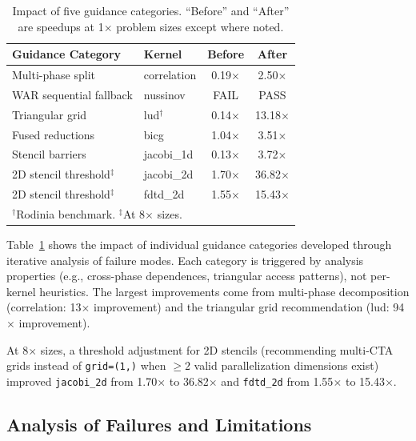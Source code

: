 \documentclass[sigconf]{acmart}
\begin{document}
\begin{table}[t]
  \caption{Impact of five guidance categories.  ``Before'' and
    ``After'' are speedups at 1$\times$ problem sizes except where noted.}
  \label{tab:guidance_fixes}
  \centering\small
  \begin{tabular}{llcc}
    \toprule
    \textbf{Guidance Category} & \textbf{Kernel} & \textbf{Before} & \textbf{After} \\
    \midrule
    Multi-phase split      & correlation & 0.19$\times$ & 2.50$\times$ \\
    WAR sequential fallback & nussinov   & FAIL          & PASS         \\
    Triangular grid        & lud$^\dagger$ & 0.14$\times$ & 13.18$\times$ \\
    Fused reductions       & bicg        & 1.04$\times$ & 3.51$\times$ \\
    Stencil barriers       & jacobi\_1d  & 0.13$\times$ & 3.72$\times$ \\
    \midrule
    2D stencil threshold$^\ddagger$ & jacobi\_2d & 1.70$\times$ & 36.82$\times$ \\
    2D stencil threshold$^\ddagger$ & fdtd\_2d   & 1.55$\times$ & 15.43$\times$ \\
    \bottomrule
    \multicolumn{4}{l}{\scriptsize $^\dagger$Rodinia benchmark.
      $^\ddagger$At 8$\times$ sizes.}
  \end{tabular}
\end{table}

Table~\ref{tab:guidance_fixes} shows the impact of individual guidance
categories developed through iterative analysis of failure modes.
Each category is triggered by analysis properties (e.g., cross-phase
dependences, triangular access patterns), not per-kernel heuristics.
The largest improvements come from multi-phase decomposition
(correlation: 13$\times$ improvement) and the triangular grid
recommendation (lud: 94$\times$ improvement).

At 8$\times$ sizes, a threshold adjustment for 2D stencils
(recommending multi-CTA grids instead of \texttt{grid=(1,)} when
$\geq2$ valid parallelization dimensions exist) improved
\texttt{jacobi\_2d} from 1.70$\times$ to 36.82$\times$ and
\texttt{fdtd\_2d} from 1.55$\times$ to 15.43$\times$.


\subsection{Analysis of Failures and Limitations}
\end{document}
